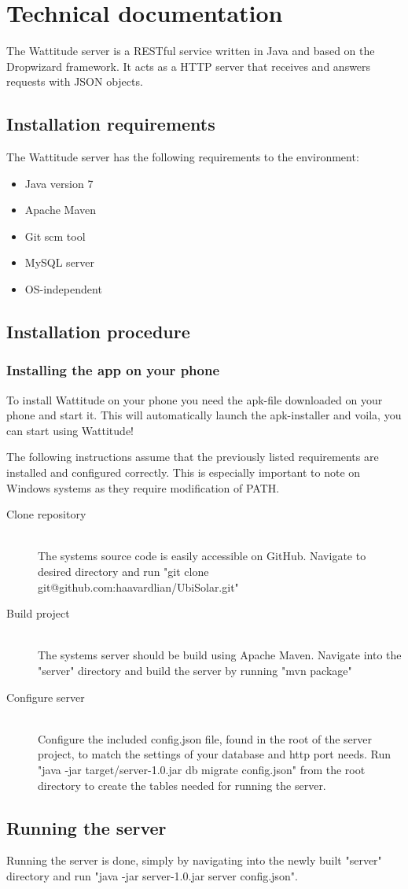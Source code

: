 \chapter{Technical documentation}
\label{sec:technicalDocumentation}
The Wattitude server is a RESTful service written in Java and based on the Dropwizard framework. It acts as a HTTP server that receives and answers requests with JSON objects. 
\section{Installation requirements}
The Wattitude server has the following requirements to the environment:
\begin{itemize}
\item Java version 7
\item Apache Maven 
\item Git scm tool
\item MySQL server
\item OS-independent
\end{itemize}
\section{Installation procedure}

\subsection{Installing the app on your phone}
\label{sec:installWattitudePhone}
To install Wattitude on your phone you need the apk-file downloaded on your phone and start it. This will automatically launch the apk-installer and voila, you can start using Wattitude!

The following instructions assume that the previously listed requirements are installed and configured correctly. This is especially important to note on Windows systems as they require modification of PATH.
\begin{description}
  \item[Clone repository] \hfill \\
  The systems source code is easily accessible on GitHub. Navigate to desired directory and run "git clone git@github.com:haavardlian/UbiSolar.git"
  \item[Build project] \hfill \\
  The systems server should be build using Apache Maven. Navigate into the "server" directory and build the server by running "mvn package"
  \item[Configure server] \hfill \\
  Configure the included config.json file, found in the root of the server project, to match the settings of your database and http port needs. Run "java -jar target/server-1.0.jar db migrate config.json" from the root directory to create the tables needed for running the server. 
  
\end{description}

\section{Running the server}
Running the server is done, simply by navigating into the newly built "server" directory and run "java -jar server-1.0.jar server config.json".